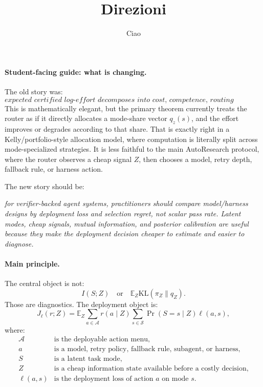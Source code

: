 \documentclass{article}
\title{Direzioni}
\author{Ciao}
\newcommand{\KL}{\mathrm{KL}}
\begin{document}
\maketitle




\paragraph{Student-facing guide: what is changing.}
The old story was:
\[
    \textit{expected certified log-effort decomposes into cost, competence,
    routing information, and routing mismatch.}
\]
This is mathematically elegant, but the primary theorem currently treats the router as if it
directly allocates a mode-share vector \(q_z(s)\), and the effort improves or degrades
according to that share.
That is exactly right in a Kelly/portfolio-style allocation model, where computation is
literally split across mode-specialized strategies.
It is less faithful to the main AutoResearch protocol, where the router observes a cheap
signal \(Z\), then chooses a model, retry depth, fallback rule, or harness action.

The new story should be:
\begin{center}
    \textit{for verifier-backed agent systems, practitioners should compare
    model/harness designs by deployment loss and selection regret, not scalar pass rate.
    Latent modes, cheap signals, mutual information, and posterior calibration are useful
    because they make the deployment decision cheaper to estimate and easier to diagnose.}
\end{center}

\paragraph{Main principle.}
The central object is not:
\[
    I(S;Z)
    \quad\text{or}\quad
    \mathbb E_Z \KL(\pi_Z\|q_Z).
\]
Those are diagnostics.
The deployment object is:
\[
    J_\ell(r;Z)
    =
    \mathbb E_Z
    \sum_{a\in\mathcal A} r(a\mid Z)
    \sum_{s\in\mathcal S}\Pr(S=s\mid Z)\ell(a,s),
\]
where:
\[
\begin{array}{ll}
    \mathcal A & \text{is the deployable action menu},\\
    a          & \text{is a model, retry policy, fallback rule, subagent, or harness},\\
    S          & \text{is a latent task mode},\\
    Z          & \text{is a cheap information state available before a costly decision},\\
    \ell(a,s)  & \text{is the deployment loss of action \(a\) on mode \(s\)}.
\end{array}
\]
\end{document}
